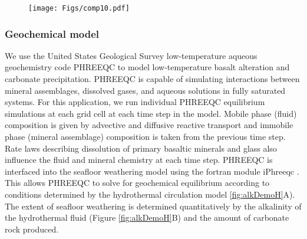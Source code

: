 \documentclass[authoryear,round,12pt]{article}
\begin{document}
\begin{figure}[h]
  {\texttt{[image: Figs/comp10.pdf]}}
\end{figure}

%
%
%

\subsubsection{Geochemical model}
\label{sec:geochemical}



We use the United States Geological Survey low-temperature aqueous
geochemistry code PHREEQC \citep{phreeqc2013} to model low-temperature
basalt alteration and carbonate precipitation. PHREEQC is capable of
simulating interactions between mineral assemblages, dissolved gases,
and aqueous solutions in fully saturated systems. For this
application, we run individual PHREEQC equilibrium simulations at
each grid cell at each time step in the model. Mobile phase (fluid)
composition is given by advective and diffusive reactive
transport  and immobile phase (mineral
assemblage) composition is taken from the previous time step. Rate
laws describing dissolution of primary basaltic minerals and glass
also influence the fluid and mineral chemistry at each time
step\citep{gislason1993, gislason2003, pham2012}. PHREEQC is interfaced into the seafloor weathering model using
the fortran module iPhreeqc \citep{iphreeqc2011}. This allows PHREEQC to solve
for geochemical equilibrium according to conditions determined by the 
hydrothermal circulation model \ref{fig:alkDemoH}A). The extent of seafloor weathering
is determined quantitatively by the alkalinity of the hydrothermal fluid (Figure \ref{fig:alkDemoH}B) and the amount of carbonate rock produced.
\end{document}
